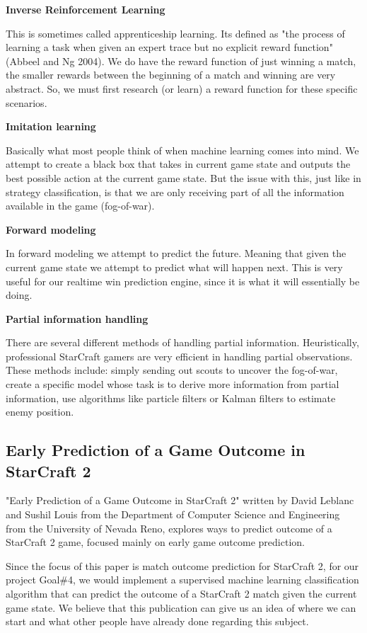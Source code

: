 \documentclass[a4paper,12pt]{report}
\newcommand{\msection}[1]{\noindent\textbf{#1}}
\begin{document}
\msection{Inverse Reinforcement Learning}

This is sometimes called apprenticeship learning. Its defined as "the process of learning a task when given an expert trace but no explicit reward function" (Abbeel and Ng 2004). We do have the reward function of just winning a match, the smaller rewards between the beginning of a match and winning are very abstract. So, we must first research (or learn) a reward function for these specific scenarios.

\msection{Imitation learning}

Basically what most people think of when machine learning comes into mind. We attempt to create a black box that takes in current game state and outputs the best possible action at the current game state. But the issue with this, just like in strategy classification, is that we are only receiving part of all the information available in the game (fog-of-war).

\msection{Forward modeling}

In forward modeling we attempt to predict the future. Meaning that given the current game state we attempt to predict what will happen next. This is very useful for our realtime win prediction engine, since it is what it will essentially be doing.

\msection{Partial information handling}

There are several different methods of handling partial information. Heuristically, professional StarCraft gamers are very efficient in handling partial observations. These methods include: simply sending out scouts to uncover the fog-of-war, create a specific model whose task is to derive more information from partial information, use algorithms like particle filters or Kalman filters to estimate enemy position.

\subsection{Early Prediction of a Game Outcome in StarCraft 2}

"Early Prediction of a Game Outcome in StarCraft 2" written by David Leblanc and Sushil Louis from the Department of Computer Science and Engineering from the University of Nevada Reno, explores ways to predict outcome of a StarCraft 2 game, focused mainly on early game outcome prediction.

Since the focus of this paper is match outcome prediction for StarCraft 2, for our project Goal\#4, we would implement a supervised machine learning classification algorithm that can predict the outcome of a StarCraft 2 match given the current game state. We believe that this publication can give us an idea of where we can start and what other people have already done regarding this subject.
\end{document}

